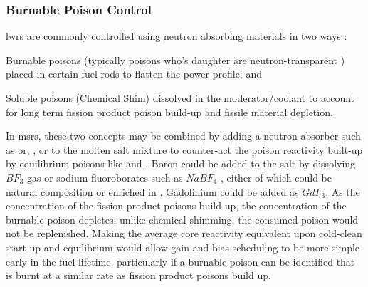 \subsubsection{Burnable Poison Control}
\acsp{lwr} are commonly controlled using neutron absorbing materials in two ways \cite[Ch. 8]{Kerlin}:
\begin{enumerate*}
    \item Burnable poisons (typically poisons who's daughter are neutron-transparent \cite[Ch. 14]{DH}) placed in certain fuel rods to flatten the power profile; and 
    \item Soluble poisons (\ie Chemical Shim) dissolved in the moderator/coolant to account for long term fission product poison build-up and fissile material depletion.
\end{enumerate*}
In \acsp{msr}, these two concepts may be combined by adding a neutron absorber such as \B[10] or, \Gd[155], or \Gd to the molten salt mixture to counter-act the poison reactivity built-up by equilibrium poisons like \Xe and \Sa. Boron could be added to the salt by dissolving $BF_3$ gas \cite{BF3} or sodium fluoroborates such as $NaBF_4$ \cite{ORNL-BoronHastelloy}, either of which could be natural composition or enriched in \B[10]. Gadolinium could be added as $GdF_3$.  As the concentration of the fission product poisons build up, the concentration of the burnable poison depletes; unlike chemical shimming, the consumed poison would not be replenished. Making the average core reactivity equivalent upon cold-clean start-up and equilibrium would allow gain and bias scheduling to be more simple early in the fuel lifetime, particularly if a burnable poison can be identified that is burnt at a similar rate as fission product poisons build up.


